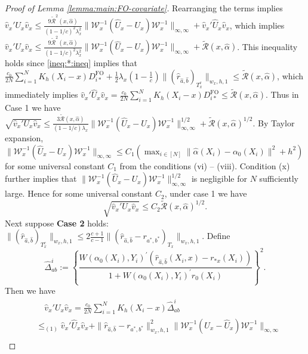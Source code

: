 \documentclass[10pt,a4paper]{amsart}
\begin{document}
\begin{proof}[Proof of Lemma \ref{lemma:main:FO-covariate}]
Rearranging the terms implies $\hat v_x' U_x \hat v_x \leq  \frac{9\widetilde{\mathcal{R}}^2(x,\hat\alpha)}{(1-1/c)^2\lambda_x^2} \|\mathcal{W}_x^{-1}(\hat U_x - U_x)\mathcal{W}_x^{-1} \|_{\infty,\infty} + \hat v_x'\hat U_x \hat v_x$, which implies $\hat v_x' U_x \hat v_x\leq\frac{9\widetilde{\mathcal{R}}^2(x,\hat\alpha)}{(1-1/c)^2\lambda_x^2} \|\mathcal{W}_x^{-1}(\hat U_x - U_x)\mathcal{W}_x^{-1} \|_{\infty,\infty} +\widetilde{\mathcal{R}}(x,\hat\alpha)$. This inequality holds since \eqref{ineq:*:ineq} implies that $\frac{c_0}{2N}\sum_{i=1}^NK_h(X_i-x)D_{i*}^{\mathrm{FO}} + \frac{1}{2}\lambda_x\left(1-\frac{1}{c}\right)\|(\hat r_{\hat a,\hat b})_{T^c_x}\|_{w_x,h,1}\leq\widetilde{\mathcal{R}}(x,\hat\alpha)$, which immediately implies $\hat v_x'\hat U_x \hat v_x=\frac{c_0}{2N}\sum_{i=1}^NK_h(X_i-x)D_{i*}^{\mathrm{FO}}\leq\widetilde{\mathcal{R}}(x,\hat\alpha)$. Thus in Case 1 we have $\sqrt{\hat v_x' U_x \hat v_x}\leq\frac{3\widetilde{\mathcal{R}}(x,\hat\alpha)}{(1-1/c)\lambda_x} \|\mathcal{W}_x^{-1}(\hat U_x - U_x)\mathcal{W}_x^{-1} \|_{\infty,\infty}^{1/2}+\widetilde{\mathcal{R}}(x,\hat\alpha)^{1/2}$. By Taylor expansion, $\|\mathcal{W}_x^{-1}(\hat U_x - U_x)\mathcal{W}_x^{-1} \|_{\infty,\infty}\leq C_1(\max_{i\in[N]}\|\hat{\alpha}(X_i)-\alpha_0(X_i)\|^2+h^2)$ for some universal constant $C_1$ from the conditions (vi) -- (viii). 
Condition (x) further implies that $\|\mathcal{W}_x^{-1}(\hat U_x - U_x)\mathcal{W}_x^{-1} \|_{\infty,\infty}^{1/2}$ is negligible for $N$ sufficiently large. Hence for some universal constant $C_2$, under case 1 we have 
\begin{equation}\label{eq:case1:covariate}
\sqrt{\hat v_x' U_x \hat v_x}\leq C_2\widetilde{\mathcal{R}}(x,\hat\alpha)^{1/2}.
\end{equation}
Next suppose \textbf{Case 2} holds: $\displaystyle\|(\hat r_{\hat a, \hat b})_{T_x^c}\|_{w_x,h,1} \leq 2\frac{c+1}{c-1}\|(\hat r_{\hat a,\hat b} - r_{a^*,b^*})_{T_x}\|_{w_x,h,1}$. Define $$\displaystyle\hat{\Delta}_{ab}^i:=\left\{\frac{W(\alpha_0(X_i),Y_i)^\prime(\hat{r}_{\hat a,\hat b}(X_i,x)-r_{*x}(X_i))}{1+W(\alpha_0(X_i),Y_i)^\prime r_0(X_i)}\right\}^2.$$ 
Then we have
\begin{equation}\label{eq:thm1:main:main:well:covariate}
\begin{array}{rl}
&\displaystyle\quad \hat v_x' U_x \hat v_x=\frac{c_0}{2N} \sum_{i=1}^NK_h(X_i-x)\hat{\Delta}_{ab}^i\\
&\displaystyle\leq_{(1)}\hat v_x' \hat{U}_x \hat v_x+\|\hat r_{\hat a,\hat b} - r_{a^*,b^*}\|_{w_x,h,1}^2\! \|\mathcal{W}_x^{-1}(U_x-\hat U_x)\mathcal{W}_x^{-1}\|_{\infty,\infty}\\

\end{array}
\end{equation}
\end{proof}
\end{document}
